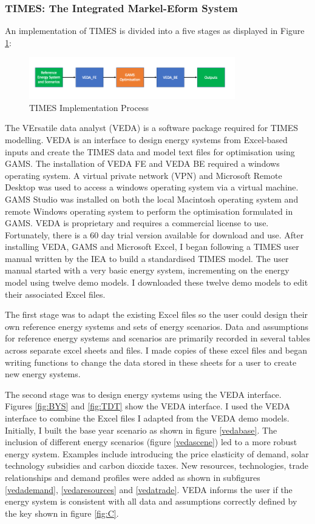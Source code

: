 \documentclass[12pt]{article}
\begin{document}
\subsubsection{TIMES: The Integrated Markel-Eform System}
An implementation of TIMES is divided into a five stages as displayed in Figure \ref{fig:times}:
\begin{figure}[H]
    \centering
	\includegraphics[width=0.8\textwidth]{TIMES.png}
	\caption{TIMES Implementation Process}
	\label{fig:times}
\end{figure}

The VErsatile data analyst (VEDA) \cite{VEDA} is a software package required for TIMES modelling. 
VEDA is an interface to design energy systems from Excel-based inputs and create the TIMES data and model text files for optimisation using GAMS.
The installation of VEDA FE and VEDA BE required a windows operating system. A virtual private network (VPN)
and Microsoft Remote Desktop was used to access a windows operating system via a virtual machine. GAMS Studio was installed on both 
the local Macintosh operating system and remote Windows operating system to perform the optimisation formulated in GAMS.
VEDA is proprietary and requires a commercial license to use. 
Fortunately, there is a 60 day trial version available for download and use.
After installing VEDA, GAMS and Microsoft Excel, I began following a TIMES user manual written by the IEA to build a standardised TIMES model.
The user manual started with a very basic energy system, incrementing on the energy model using twelve demo models.
I downloaded these twelve demo models to edit their associated Excel files.

The first stage was to adapt the existing Excel files so the user could design their own reference energy systems and sets of energy scenarios. 
Data and assumptions for reference energy systems and scenarios are primarily recorded in several tables across separate excel sheets and files.
I made copies of these excel files and began writing functions to change the data stored in these sheets for a user to create new energy systems.

The second stage was to design energy systems using the VEDA interface. Figures \ref{fig:BYS} and \ref{fig:TDT} show the VEDA interface. 
I used the VEDA interface to combine the Excel files I adapted from the VEDA demo models.
Initially, I built the base year scenario as shown in figure \ref{vedabase}. 
The inclusion of different energy scenarios (figure \ref{vedascene}) led to a more robust energy system.
Examples include introducing the price elasticity of demand, solar technology subsidies and carbon dioxide taxes.
New resources, technologies, trade relationships and demand profiles were added as shown in subfigures \ref{vedademand}, \ref{vedaresources} and \ref{vedatrade}.
VEDA informs the user if the energy system is consistent with all data and assumptions correctly defined by the key shown in figure \ref{fig:C}.
\end{document}
